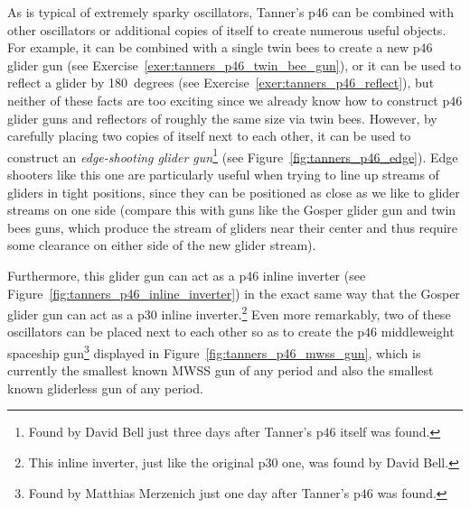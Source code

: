 As is typical of extremely sparky oscillators, Tanner's p46 can be combined with other oscillators or additional copies of itself to create numerous useful objects. For example, it can be combined with a single twin bees to create a new p$46$ glider gun (see Exercise~\ref{exer:tanners_p46_twin_bee_gun}), or it can be used to reflect a glider by 180~degrees (see Exercise~\ref{exer:tanners_p46_reflect}), but neither of these facts are too exciting since we already know how to construct p$46$ glider guns and reflectors of roughly the same size via twin bees. However, by carefully placing two copies of itself next to each other, it can be used to construct an \emph{edge-shooting glider gun}\footnote{Found by David Bell just three days after Tanner's p$46$ itself was found.} (see Figure~\ref{fig:tanners_p46_edge}). Edge shooters like this one are particularly useful when trying to line up streams of gliders in tight positions, since they can be positioned as close as we like to glider streams on one side (compare this with guns like the Gosper glider gun and twin bees guns, which produce the stream of gliders near their center and thus require some clearance on either side of the new glider stream).

Furthermore, this glider gun can act as a p$46$ inline inverter (see Figure~\ref{fig:tanners_p46_inline_inverter}) in the exact same way that the Gosper glider gun can act as a p$30$ inline inverter.\footnote{This inline inverter, just like the original p$30$ one, was found by David Bell.} Even more remarkably, two of these oscillators can be placed next to each other so as to create the p$46$ middleweight spaceship gun\footnote{Found by Matthias Merzenich just one day after Tanner's p$46$ was found.} displayed in Figure~\ref{fig:tanners_p46_mwss_gun}, which is currently the smallest known MWSS gun of any period and also the smallest known gliderless gun of any period.

